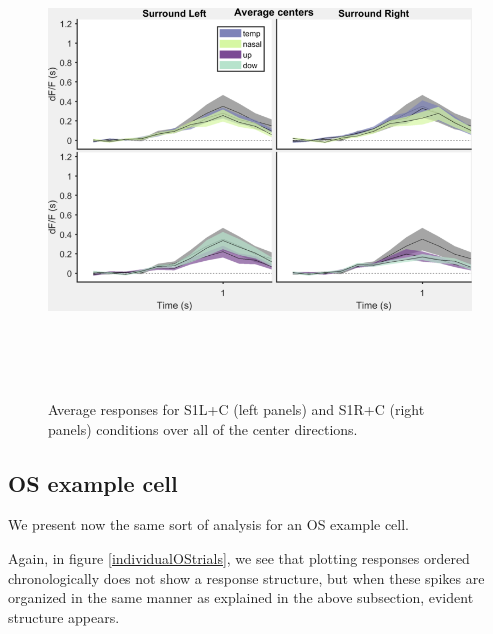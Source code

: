 \begin{figure}[H] \centering \includegraphics[width=12.5cm,height=12.5cm,keepaspectratio]{Figures/7.Results/individualSM/roi_29_mf379_pos5/averagecenters.png} 
\caption{Average responses for S1L+C (left panels) and S1R+C (right panels) conditions over all of the center directions.
\label{DSexamplecellaverage}}
\end{figure}

\subsection{OS example cell}

We present now the same sort of analysis for an OS example cell.

Again, in figure \ref{individualOStrials}, we see that plotting responses ordered chronologically does not show a response structure, but when these spikes are organized in the same manner as explained in the above subsection, evident structure appears.

